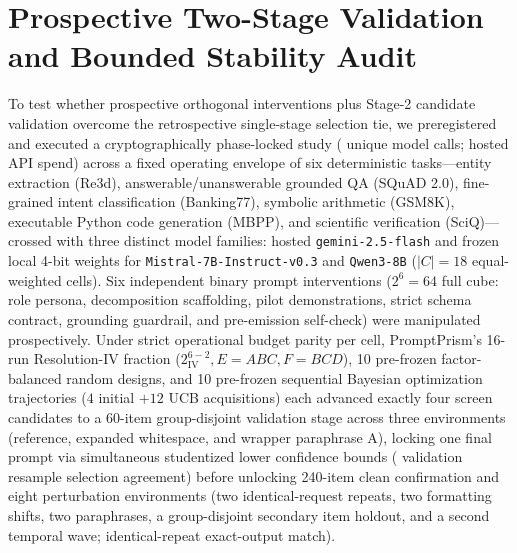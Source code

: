 \documentclass[11pt,a4paper]{article}
\newcommand{\method}{PromptPrism}
\begin{document}
\section{Prospective Two-Stage Validation and Bounded Stability Audit}
To test whether prospective orthogonal interventions plus Stage-2 candidate validation overcome the retrospective single-stage selection tie, we preregistered and executed a cryptographically phase-locked study (\RealVFourTotalCalls{} unique model calls; \RealVFourHostedUsd{} hosted API spend) across a fixed operating envelope of six deterministic tasks—entity extraction (Re3d), answerable/unanswerable grounded QA (SQuAD 2.0), fine-grained intent classification (Banking77), symbolic arithmetic (GSM8K), executable Python code generation (MBPP), and scientific verification (SciQ)—crossed with three distinct model families: hosted \texttt{gemini-2.5-flash} and frozen local 4-bit weights for \texttt{Mistral-7B-Instruct-v0.3} and \texttt{Qwen3-8B} ($|C|=18$ equal-weighted cells). Six independent binary prompt interventions ($2^6=64$ full cube: role persona, decomposition scaffolding, pilot demonstrations, strict schema contract, grounding guardrail, and pre-emission self-check) were manipulated prospectively. Under strict operational budget parity per cell, \method{}'s 16-run Resolution-IV fraction ($2^{6-2}_{\mathrm{IV}}, E=ABC, F=BCD$), 10 pre-frozen factor-balanced random designs, and 10 pre-frozen sequential Bayesian optimization trajectories ($4$ initial $+ 12$ UCB acquisitions) each advanced exactly four screen candidates to a 60-item group-disjoint validation stage across three environments (reference, expanded whitespace, and wrapper paraphrase A), locking one final prompt via simultaneous studentized lower confidence bounds (\RealVFourValSelectAgreePct{} validation resample selection agreement) before unlocking 240-item clean confirmation and eight perturbation environments (two identical-request repeats, two formatting shifts, two paraphrases, a group-disjoint secondary item holdout, and a second temporal wave; \RealVFourRepeatMatchPct{} identical-repeat exact-output match).
\end{document}
